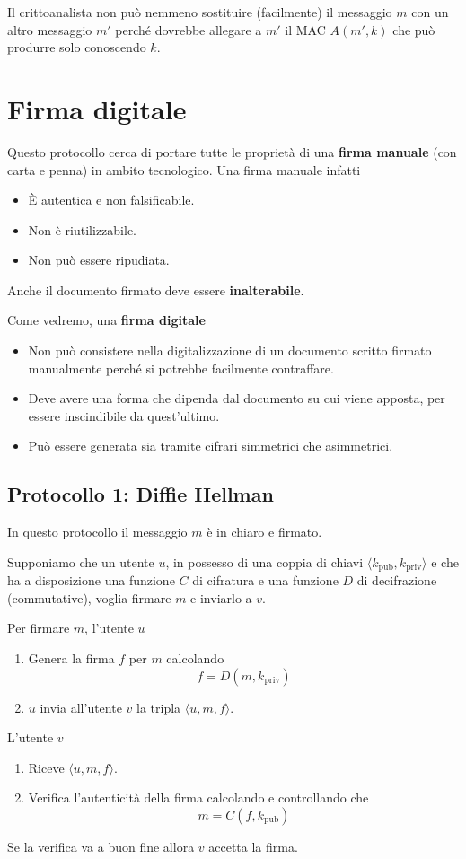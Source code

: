 Il crittoanalista non pu\`o nemmeno sostituire (facilmente) il messaggio $m$ con un altro messaggio $m'$ perch\'e
dovrebbe allegare a $m'$ il MAC $A(m', k)$ che pu\`o produrre solo conoscendo $k$.

\section{Firma digitale}
Questo protocollo cerca di portare tutte le propriet\`a di una \textbf{firma manuale} (con carta e penna) in ambito
tecnologico. Una firma manuale infatti
\begin{itemize}
	\item \`E autentica e non falsificabile.
	\item Non \`e riutilizzabile.
	\item Non pu\`o essere ripudiata.
\end{itemize}
Anche il documento firmato deve essere \textbf{inalterabile}.

Come vedremo, una \textbf{firma digitale}
\begin{itemize}
	\item Non pu\`o consistere nella digitalizzazione di un documento scritto firmato manualmente perch\'e si
	      potrebbe facilmente contraffare.
	\item Deve avere una forma che dipenda dal documento su cui viene apposta, per essere inscindibile da
	      quest'ultimo.
	\item Pu\`o essere generata sia tramite cifrari simmetrici che asimmetrici.
\end{itemize}

\subsection{Protocollo 1: Diffie Hellman}
In questo protocollo il messaggio $m$ \`e in chiaro e firmato.

Supponiamo che un utente $u$, in possesso di una coppia di chiavi $\langle k_\text{pub}, k_\text{priv} \rangle$ e
che ha a disposizione una funzione $C$ di cifratura e una funzione $D$ di decifrazione (commutative), voglia firmare
$m$ e inviarlo a $v$.

Per firmare $m$, l'utente $u$
\begin{enumerate}
	\item Genera la firma $f$ per $m$ calcolando
	      \[ f = D(m, k_\text{priv}) \]
	\item $u$ invia all'utente $v$ la tripla $\langle u, m, f \rangle$.
\end{enumerate}
L'utente $v$
\begin{enumerate}
	\item Riceve $\langle u, m, f \rangle$.
	\item Verifica l'autenticit\`a della firma calcolando e controllando che
	      \[ m = C(f, k_\text{pub}) \]
\end{enumerate}
Se la verifica va a buon fine allora $v$ accetta la firma.

